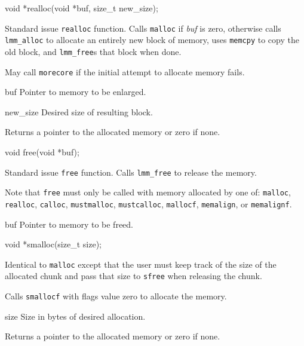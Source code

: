 \label{realloc}
\begin{apisyn}

	\funcproto void *realloc(void *buf, size_t new_size);
\end{apisyn}
\begin{apidesc}
	Standard issue {\tt realloc} function.
	Calls {\tt malloc} if \emph{buf} is zero,
	otherwise calls {\tt lmm_alloc} to allocate an entirely
	new block of memory, uses {\tt memcpy} to copy the old block,
	and {\tt lmm_free}s that block when done.

	May call {\tt morecore} if the initial attempt to allocate
	memory fails.
\end{apidesc}
\begin{apiparm}
	\item[buf]
		Pointer to memory to be enlarged.
	\item[new_size]
		Desired size of resulting block.
\end{apiparm}
\begin{apiret}
	Returns a pointer to the allocated memory or zero if none.
\end{apiret}

\label{free}
\begin{apisyn}

	\funcproto void free(void *buf);
\end{apisyn}
\begin{apidesc}
	Standard issue {\tt free} function.
	Calls {\tt lmm_free} to release the memory.

	Note that {\tt free} must only be called with memory allocated
	by one of:
	{\tt malloc}, {\tt realloc}, {\tt calloc}, {\tt mustmalloc},
	{\tt mustcalloc}, {\tt mallocf}, {\tt memalign}, or {\tt memalignf}.
\end{apidesc}
\begin{apiparm}
	\item[buf]
		Pointer to memory to be freed.
\end{apiparm}

\label{smalloc}
\begin{apisyn}

	\funcproto void *smalloc(size_t size);
\end{apisyn}
\begin{apidesc}
	Identical to {\tt malloc} except that
	the user must keep track of the size of the allocated chunk
	and pass that size to \texttt{sfree} when releasing the chunk.

	Calls {\tt smallocf} with flags value zero to allocate the memory.
\end{apidesc}
\begin{apiparm}
	\item[size]
		Size in bytes of desired allocation.
\end{apiparm}
\begin{apiret}
	Returns a pointer to the allocated memory or zero if none.
\end{apiret}

